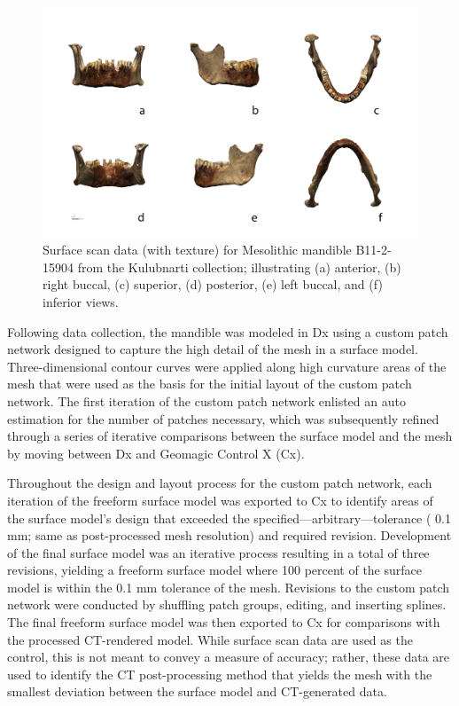 \documentclass[review]{elsarticle}
\begin{document}
\begin{figure}[ht]\centering
\includegraphics[width=\linewidth]{Fig1}
\caption{Surface scan data (with texture) for Mesolithic mandible B11-2-15904 from the Kulubnarti collection; illustrating (a) anterior, (b) right buccal, (c) superior, (d) posterior, (e) left buccal, and (f) inferior views.}
\label{fig:Fig2}
\end{figure}

Following data collection, the mandible was modeled in Dx using a custom patch network designed to capture the high detail of the mesh in a surface model. Three-dimensional contour curves were applied along high curvature areas of the mesh that were used as the basis for the initial layout of the custom patch network. The first iteration of the custom patch network enlisted an auto estimation for the number of patches necessary, which was subsequently refined through a series of iterative comparisons between the surface model and the mesh by moving between Dx and Geomagic Control X (Cx).

Throughout the design and layout process for the custom patch network, each iteration of the freeform surface model was exported to Cx to identify areas of the surface model’s design that exceeded the specified---arbitrary---tolerance ( 0.1 mm; same as post-processed mesh resolution) and required revision. Development of the final surface model was an iterative process resulting in a total of three revisions, yielding a freeform surface model where 100 percent of the surface model is within the  0.1 mm tolerance of the mesh. Revisions to the custom patch network were conducted by shuffling patch groups, editing, and inserting splines. The final freeform surface model was then exported to Cx for comparisons with the processed CT-rendered model. While surface scan data are used as the control, this is not meant to convey a measure of accuracy; rather, these data are used to identify the CT post-processing method that yields the mesh with the smallest deviation between the surface model and CT-generated data.
\end{document}
